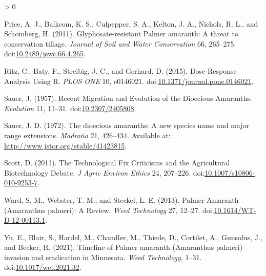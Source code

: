 \documentclass[utf8]{frontiersSCNS}
\newlength{\cslhangindent}
\newenvironment{CSLReferences}[2] %
 {%
  \setlength{\parindent}{0pt}
  \ifodd #1 \everypar{\setlength{\hangindent}{\cslhangindent}}\ignorespaces\fi
  \ifnum #2 > 0
  \setlength{\parskip}{#2\baselineskip}
  \fi
 }%
 {}
\begin{document}
\begin{CSLReferences}{1}{0}
\leavevmode\hypertarget{ref-price2011}{}%
Price, A. J., Balkcom, K. S., Culpepper, S. A., Kelton, J. A., Nichols,
R. L., and Schomberg, H. (2011). Glyphosate-resistant {Palmer} amaranth:
{A} threat to conservation tillage. \emph{Journal of Soil and Water
Conservation} 66, 265--275.
doi:\href{https://doi.org/10.2489/jswc.66.4.265}{10.2489/jswc.66.4.265}.

\leavevmode\hypertarget{ref-ritz2015}{}%
Ritz, C., Baty, F., Streibig, J. C., and Gerhard, D. (2015).
Dose-{Response Analysis Using R}. \emph{PLOS ONE} 10, e0146021.
doi:\href{https://doi.org/10.1371/journal.pone.0146021}{10.1371/journal.pone.0146021}.

\leavevmode\hypertarget{ref-sauer1957}{}%
Sauer, J. (1957). Recent {Migration} and {Evolution} of the {Dioecious
Amaranths}. \emph{Evolution} 11, 11--31.
doi:\href{https://doi.org/10.2307/2405808}{10.2307/2405808}.

\leavevmode\hypertarget{ref-sauer1972}{}%
Sauer, J. D. (1972). The dioecious amaranths: A new species name and
major range extensions. \emph{Madroño} 21, 426--434. Available at:
\url{http://www.jstor.org/stable/41423815}.

\leavevmode\hypertarget{ref-scott2011}{}%
Scott, D. (2011). The {Technological Fix Criticisms} and the
{Agricultural Biotechnology Debate}. \emph{J Agric Environ Ethics} 24,
207--226.
doi:\href{https://doi.org/10.1007/s10806-010-9253-7}{10.1007/s10806-010-9253-7}.

\leavevmode\hypertarget{ref-ward2013}{}%
Ward, S. M., Webster, T. M., and Steckel, L. E. (2013). Palmer
{Amaranth} ({Amaranthus} palmeri): {A Review}. \emph{Weed Technology}
27, 12--27.
doi:\href{https://doi.org/10.1614/WT-D-12-00113.1}{10.1614/WT-D-12-00113.1}.

\leavevmode\hypertarget{ref-yu2021}{}%
Yu, E., Blair, S., Hardel, M., Chandler, M., Thiede, D., Cortilet, A.,
Gunsolus, J., and Becker, R. (2021). Timeline of {Palmer} amaranth
({Amaranthus} palmeri) invasion and eradication in {Minnesota}.
\emph{Weed Technology}, 1--31.
doi:\href{https://doi.org/10.1017/wet.2021.32}{10.1017/wet.2021.32}.

\end{CSLReferences}
\end{document}
